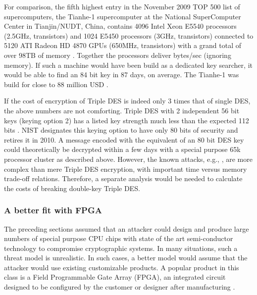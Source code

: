 \documentclass{article}
\begin{document}
\begin{comment}
84 bit
 120*84*2^(84-1)/(2.15*10^9*8.5*10^8*2^(16)*60*60*24)
96 bit
 120*96*2^(96-1)/(2.15*10^9*8.5*10^8*2^(16)*60*60*24*365)
\end{comment}

For comparison, the fifth highest entry in the November 2009 TOP 500 list of supercomputers,
the Tianhe-1 supercomputer at the National SuperComputer 
Center in Tianjin/NUDT, China, contains 4096 Intel Xeon E5540 processors (2.5GHz, 
 transistors) and 1024 E5450 processors (3GHz,  transistors) 
connected to 5120 ATI Radeon HD 4870 GPUs (650MHz,  transistors)
with a grand total of over 98TB of memory \cite{StromGPU2009,Tianhe1,Valich2009}.
Together the processors deliver  bytes/sec (ignoring memory). If such a machine 
would have been build as a dedicated   key searcher, it would be able to find an 
84 bit   key in 87 days, on average. The Tianhe-1 was build for close to
88 million USD \cite{Valich2009}.

\begin{comment}
Tianhe-1 84 bits
120*84*2^(84-1)/(1.3*10^(22)*60*60*24)
\end{comment}

If the cost of encryption of Triple DES is indeed only 3 times that of single DES, the above 
numbers are not comforting. Triple DES with 2 independent 56 bit keys (keying option 2) has a listed
key strength much less than the expected 112 bits \cite{lucks1998attacking,OorschotWiener90known}. 
NIST designates this keying option to have only 80 bits of security \cite{Polketal2006} and retires it
in 2010. A message  encoded with the equivalent of an 80 bit  DES key could theoretically be decrypted within a 
few days with a special purpose 65k processor cluster as described above. However, the known 
attacks, e.g., \cite{OorschotWiener90known,lucks1998attacking}, are more complex than mere 
Triple DES encryption, with important time versus memory trade-off relations. 
Therefore, a separate analysis would be needed to calculate the costs of breaking double-key Triple DES.

\subsubsection{A better fit with FPGA}\label{SectFPGA}

The preceding sections assumed that an attacker could design and produce large numbers
of special purpose CPU chips with state of the art semi-conductor technology to compromise 
cryptographic systems. In many situations, such a threat model is unrealistic. In such cases, 
a better model would assume that the attacker would use existing customizable products.
A popular product in this class is a Field Programmable Gate Array (FPGA), an integrated circuit designed to be configured by the customer or designer after manufacturing \cite{WikipediaFPGA}.
\end{document}
